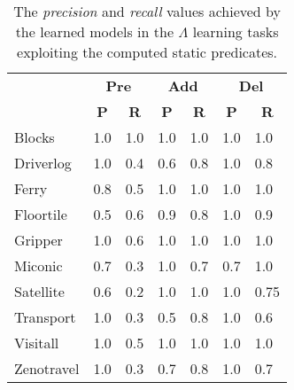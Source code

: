 \documentclass[letterpaper]{article} %
\begin{document}
\begin{table}[hbt!]
\begin{footnotesize}
	\begin{center}
		\begin{tabular}{l|l|l|l|l|l|l|}
			 & \multicolumn{2}{|c|}{\bf Pre} & \multicolumn{2}{|c|}{\bf Add} & \multicolumn{2}{|c|}{\bf Del}  \\ \cline{2-7}			
			  & \multicolumn{1}{|c|}{\bf P} & \multicolumn{1}{|c|}{\bf R} & \multicolumn{1}{|c|}{\bf P} & \multicolumn{1}{|c|}{\bf R} & \multicolumn{1}{|c|}{\bf P} & \multicolumn{1}{|c|}{\bf R} \\
			\hline
			Blocks & 1.0 & 1.0 & 1.0 & 1.0 & 1.0 & 1.0 \\
			Driverlog & 1.0 & 0.4 & 0.6 & 0.8 & 1.0 & 0.8 \\
			Ferry & 0.8 & 0.5 & 1.0 & 1.0 & 1.0 & 1.0 \\
			Floortile & 0.5 & 0.6 & 0.9 & 0.8 & 1.0 & 0.9 \\
			Gripper & 1.0 & 0.6 & 1.0 & 1.0 & 1.0 & 1.0 \\
			Miconic & 0.7 & 0.3 & 1.0 & 0.7 & 0.7 & 1.0 \\
			Satellite & 0.6 & 0.2 & 1.0 & 1.0 & 1.0 & 0.75 \\
			Transport & 1.0 & 0.3 & 0.5 & 0.8 & 1.0 & 0.6 \\
			Visitall & 1.0 & 0.5 & 1.0 & 1.0 & 1.0 & 1.0 \\
			Zenotravel & 1.0 & 0.3 & 0.7 & 0.8 & 1.0 & 0.7
		\end{tabular}
	\end{center}
	\end{footnotesize}
\caption{\small The {\em precision} and {\em recall} values achieved by the learned models in the $\Lambda$ learning tasks exploiting the computed static predicates.}
\label{tab:results_plans_static}
\end{table}
\end{document}
